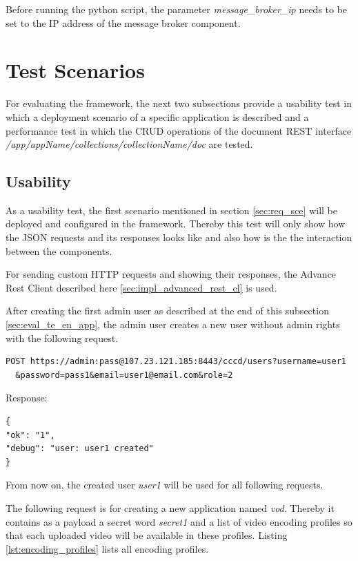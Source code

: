 Before running the python script, the parameter \textit{message\_broker\_ip} needs to be set to the IP address of the message broker component.

\section{Test Scenarios\label{sec:eval__te_sc}}
For evaluating the framework, the next two subsections provide a usability test in which a deployment scenario of a specific application is described and a performance test in which the \ac{CRUD} operations of the document REST interface \textit{/app/{appName}/collections/{collectionName}/doc} are tested.

\subsection{Usability\label{seq:eval_usab}}
As a usability test, the first scenario mentioned in section \ref{sec:req_sce} will be deployed and configured in the framework. Thereby this test will only show how the \ac{JSON} requests and its responses looks like and also how is the the interaction between the components.

For sending custom \ac{HTTP} requests and showing their responses, the Advance Rest Client described here \ref{sec:impl_advanced_rest_cl} is used.

After creating the first admin user as described at the end of this subsection \ref{sec:eval_te_en_app}, the admin user creates a new user without admin rights with the following request.
\begin{code}
\begin{verbatim}
POST https://admin:pass@107.23.121.185:8443/cccd/users?username=user1
  &password=pass1&email=user1@email.com&role=2
\end{verbatim}
Response:
\begin{verbatim}
{
"ok": "1",
"debug": "user: user1 created"
}
\end{verbatim}
\end{code}

From now on, the created user \textit{user1} will be used for all following requests.

The following request is for creating a new application named \textit{vod}. Thereby it contains as a payload a secret word \textit{secret1} and a list of video encoding profiles so that each uploaded video will be available in these profiles. Listing \ref{lst:encoding_profiles} lists all encoding profiles.

